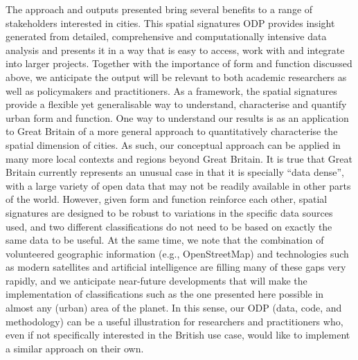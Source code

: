 \documentclass[fleqn,10pt]{wlscirep}
\begin{document}
The approach and outputs presented bring several benefits to a range of
stakeholders interested in cities.
This spatial signatures ODP provides insight generated from detailed,
comprehensive and computationally intensive data analysis and presents it in a
way that is easy to access, work with and integrate into larger projects.
%
Together with the importance of form and function discussed above, we
anticipate the output will be relevant to both academic researchers as well as
policymakers and practitioners.
As a framework, the spatial signatures provide a flexible yet
generalisable way to understand, characterise and quantify urban form and
function.
One way to understand our results is as an application to Great
Britain of a more general approach to quantitatively characterise the spatial dimension of cities.
As such, our conceptual approach can be applied in many more
local contexts and regions beyond Great Britain.
%
It is true that Great Britain currently represents an unusual case in that it
is specially ``data dense'', with a large variety of open data that may not be
readily available in other parts of the world. However, given form and
function reinforce each other, spatial signatures are designed to be robust to
variations in the specific data sources used, and two different
classifications do not need to be based on exactly the same data to be useful.
At the same time, we note that
the combination of volunteered geographic information (e.g., OpenStreetMap)
and technologies such as modern satellites and artificial intelligence are
filling many of these gaps very rapidly, and we anticipate near-future
developments that will make the implementation of classifications such as the
one presented here possible in almost any (urban) area of the planet.
%
In this sense, our ODP (data, code, and methodology) can be a useful illustration for researchers and practitioners who, even if not
specifically interested in the British use case, would like to implement a similar
approach on their own.
\end{document}
